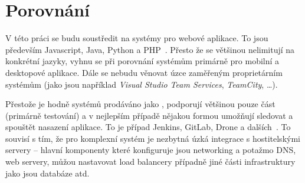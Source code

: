 \chapter{Porovnání}
    V této práci se budu soustředit na systémy pro webové aplikace. To jsou především Javascript, Java, Python a PHP~\cite{github-octoverse-languages}. Přesto že se \CI většinou nelimitují na konkrétní jazyky, vyhnu se při porovnání systémům primárně pro mobilní a desktopové aplikace. Dále se nebudu věnovat úzce zaměřeným proprietárním systémům (jako jsou například \textit{Visual Studio Team Services}, \textit{TeamCity}, \ldots).


    Přestože je hodně systémů prodáváno jako \CICD, podporují většinou pouze \CI část (primárně testování) a v nejlepším případě nějakou formou umožňují sledovat a spouštět nasazení aplikace. To je případ Jenkins, GitLab, Drone a dalších~\cite{ellingwood-cicd-list}. To souvisí s tím, že pro komplexní \CD systém je nezbytná úzká integrace s hostitelskými servery -- hlavní komponenty které \CD konfiguruje jsou networking a potažmo DNS, \HTTP web servery, můžou nastavovat load balancery případně jiné části infrastruktury jako jsou databáze atd.

    

    \newpage
    

    \newpage
    

    \newpage
    

    \newpage
    

    \newpage
    

    \newpage
    

    \newpage
    


    \newpage
    
